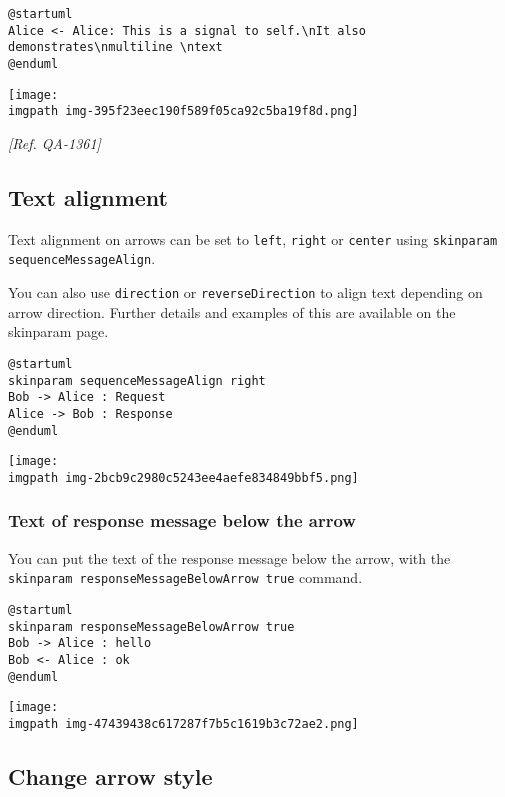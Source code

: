 \begin{verbatim}
@startuml
Alice <- Alice: This is a signal to self.\nIt also demonstrates\nmultiline \ntext
@enduml
\end{verbatim}
\begin{center}
\texttt{[image: \\imgpath img-395f23eec190f589f05ca92c5ba19f8d.png]}
\end{center}
\textit{[Ref. QA-1361]}
%
%
\subsection{Text alignment}


Text alignment on arrows can be set to \texttt{left}, \texttt{right} or \texttt{center} using \texttt{skinparam sequenceMessageAlign}. 


You can also use \texttt{direction} or \texttt{reverseDirection} to align text depending on arrow direction. Further details and examples of this are available on the skinparam page.


\begin{verbatim}
@startuml
skinparam sequenceMessageAlign right
Bob -> Alice : Request
Alice -> Bob : Response
@enduml
\end{verbatim}
\begin{center}
\texttt{[image: \\imgpath img-2bcb9c2980c5243ee4aefe834849bbf5.png]}
\end{center}


\subsubsection{Text of response message below the arrow}


You can put the text of the response message below the arrow, with the \texttt{skinparam responseMessageBelowArrow true} command.


\begin{verbatim}
@startuml
skinparam responseMessageBelowArrow true
Bob -> Alice : hello
Bob <- Alice : ok
@enduml
\end{verbatim}
\begin{center}
\texttt{[image: \\imgpath img-47439438c617287f7b5c1619b3c72ae2.png]}
\end{center}
%
%
\subsection{Change arrow style}


